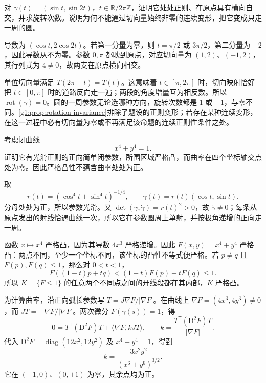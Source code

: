 \begin{exercise}\label{g1:ex:figure-eight-rotation}
	对 \(\gamma(t)=(\sin t,\sin2t)\)，\(t\in\mathbb R/2\pi\mathbb Z\)，证明它处处正则、在原点具有横向自交，并求旋转次数。说明为何不能通过切向量始终非零的连续变形，把它变成只走一周的圆。
\end{exercise}
\begin{solution}
	导数为 \((\cos t,2\cos2t)\)。若第一分量为零，则 \(t=\pi/2\) 或 \(3\pi/2\)，第二分量为 \(-2\)，因此导数从不为零。参数 \(0,\pi\) 都映到原点，对应切向量为 \((1,2)\)、\((-1,2)\)，其行列式为 \(4\ne0\)，故两支在原点横向相交。

	单位切向量满足 \(T(2\pi-t)=T(t)\)。这意味着 \(t\in[\pi,2\pi]\) 时，切向映射恰好把 \(t\in[0,\pi]\) 时的道路反向走一遍；两段的角度增量互为相反数。所以 \(\operatorname{rot}(\gamma)=0\)。圆的一周参数无论选哪种方向，旋转次数都是 \(1\) 或 \(-1\)，与零不同。\cref{g1:prop:rotation-invariance}排除了题设的正则变形；若存在某种连续变形，在这一过程中必有切向量为零或不再满足该命题的连续正则性条件之处。
\end{solution}

\begin{exercise}\label{g1:ex:superellipse-zero-curvature}
	考虑闭曲线
	\[
		x^4+y^4=1.
	\]
	证明它有光滑正则的正向简单闭参数，所围区域严格凸，而曲率在四个坐标轴交点处为零。因此严格凸性不蕴含曲率处处为正。
\end{exercise}
\begin{solution}
	取
	\[
		r(t)=(\cos^4t+\sin^4t)^{-1/4},\qquad
		\gamma(t)=r(t)(\cos t,\sin t).
	\]
	分母处处为正，所以参数光滑。又 \(\det(\gamma,\dot\gamma)=r(t)^2>0\)，故 \(\dot\gamma\ne0\)；每条从原点发出的射线恰遇曲线一次，所以它在参数圆周上单射，并按极角递增的正向走一周。

	函数 \(x\mapsto x^4\) 严格凸，因为其导数 \(4x^3\) 严格递增。因此 \(F(x,y)=x^4+y^4\) 严格凸：两点不同，至少一个坐标不同，该坐标的凸性不等式便严格。若 \(p\ne q\) 且 \(F(p),F(q)\leq1\)，那么对 \(0<t<1\)，
	\[
		F((1-t)p+tq)<(1-t)F(p)+tF(q)\leq1.
	\]
	所以 \(K=\{F\leq1\}\) 的任意两个不同点之间的开线段都在其内部，\(K\) 严格凸。

	为计算曲率，沿正向弧长参数写 \(T=J\nabla F/|\nabla F|\)。在曲线上 \(\nabla F=(4x^3,4y^3)\ne0\)，而 \(JT=-\nabla F/|\nabla F|\)。两次微分 \(F(\gamma(s))=1\)，得
	\[
		0=T^{\mathsf T}(\mathrm{D}^2F)T+\langle\nabla F,kJT\rangle,
		\qquad
		k=\frac{T^{\mathsf T}(\mathrm{D}^2F)T}{|\nabla F|}.
	\]
	代入 \(\mathrm{D}^2F=\operatorname{diag}(12x^2,12y^2)\) 及 \(x^4+y^4=1\)，得到
	\[
		k=\frac{3x^2y^2}{(x^6+y^6)^{3/2}}.
	\]
	它在 \((\pm1,0)\)、\((0,\pm1)\) 为零，其余点均为正。
\end{solution}

